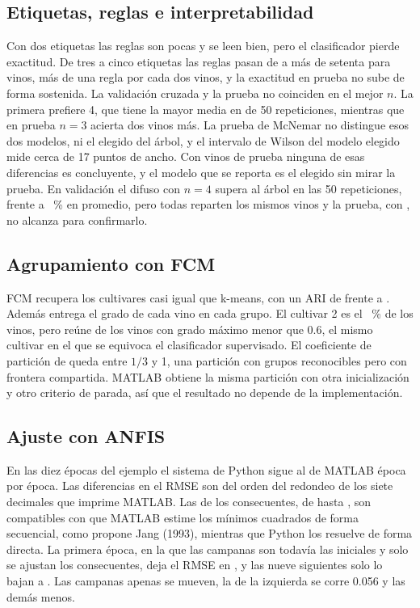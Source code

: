\documentclass[11pt,letterpaper]{article}
\begin{document}
\subsection{Etiquetas, reglas e interpretabilidad}

Con dos etiquetas las reglas son pocas y se leen bien, pero el clasificador pierde exactitud. De tres a cinco etiquetas las reglas pasan de \reglasTres{} a más de setenta para \nTr{} vinos, más de una regla por cada dos vinos, y la exactitud en prueba no sube de forma sostenida. La validación cruzada y la prueba no coinciden en el mejor $n$. La primera prefiere 4, que tiene la mayor media en \repCuatro{} de 50 repeticiones, mientras que en prueba $n=3$ acierta dos vinos más. La prueba de McNemar no distingue esos dos modelos, ni el elegido del árbol, y el intervalo de Wilson del modelo elegido mide cerca de 17 puntos de ancho. Con \nTe{} vinos de prueba ninguna de esas diferencias es concluyente, y el modelo que se reporta es el elegido sin mirar la prueba. En validación el difuso con $n=4$ supera al árbol en las 50 repeticiones, \repMediaCuatro{} frente a \repMediaArbol~\% en promedio, pero todas reparten los mismos \nTr{} vinos y la prueba, con \nTe, no alcanza para confirmarlo.

\subsection{Agrupamiento con FCM}

FCM recupera los cultivares casi igual que k-means, con un ARI de \ariFcm{} frente a \ariKm. Además entrega el grado de cada vino en cada grupo. El cultivar 2 es el \pctDos~\% de los vinos, pero reúne \bajoDos{} de los \bajoN{} vinos con grado máximo menor que 0.6, el mismo cultivar en el que se equivoca el clasificador supervisado. El coeficiente de partición de \fpc{} queda entre $1/3$ y 1, una partición con grupos reconocibles pero con frontera compartida. MATLAB obtiene la misma partición con otra inicialización y otro criterio de parada, así que el resultado no depende de la implementación.

\subsection{Ajuste con ANFIS}

En las diez épocas del ejemplo el sistema de Python sigue al de MATLAB época por época. Las diferencias en el RMSE son del orden del redondeo de los siete decimales que imprime MATLAB. Las de los consecuentes, de hasta \difL, son compatibles con que MATLAB estime los mínimos cuadrados de forma secuencial, como propone Jang (1993), mientras que Python los resuelve de forma directa. La primera época, en la que las campanas son todavía las iniciales y solo se ajustan los consecuentes, deja el RMSE en \rmseUno, y las nueve siguientes solo lo bajan a \rmseFin. Las campanas apenas se mueven, la de la izquierda se corre 0.056 y las demás menos.
\end{document}
